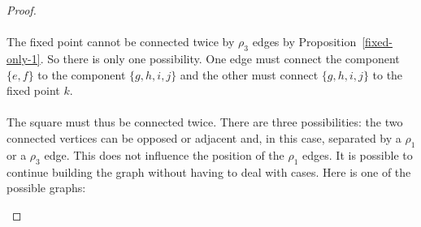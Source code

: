 \begin{proof}
\paragraph{}
The fixed point cannot be connected twice by $\rho_3$ edges by Proposition~\ref{fixed-only-1}. So there is only one possibility. One edge must connect the component $\{e,f\}$ to the component $\{g,h,i,j\}$ and the other must connect $\{g,h,i,j\}$ to the fixed point $k$.

\paragraph{}
The square must thus be connected twice. There are three possibilities: the two connected vertices can be opposed or adjacent and, in this case, separated by a $\rho_1$ or a $\rho_3$ edge. This does not influence the position of the $\rho_1$ edges. It is possible to continue building the graph without having to deal with cases. Here is one of the possible graphs:

\begin{figure}[H]
  \begin{center}
\end{center}
\end{figure}
\end{proof}
